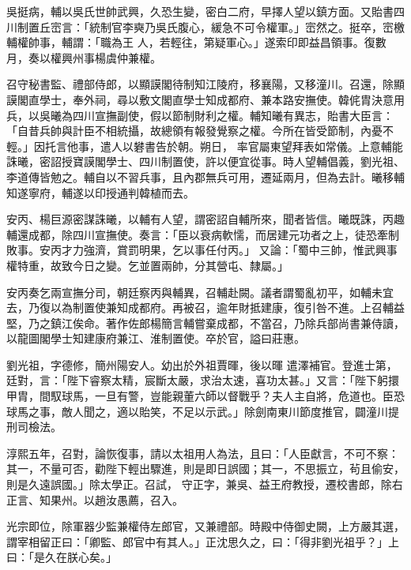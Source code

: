 \begin{pinyinscope}
 吳挺病，輔以吳氏世帥武興，久恐生變，密白二府，早擇人望以鎮方面。又貽書四川制置丘崈言：「統制官李奭乃吳氏腹心，緩急不可令權軍。」崈然之。挺卒，崈檄輔權帥事，輔謂：「職為王
 人，若輕往，第疑軍心。」遂索印即益昌領事。復數月，奏以權興州事楊虞仲兼權。



 召守秘書監、禮部侍郎，以顯謨閣待制知江陵府，移襄陽，又移潼川。召還，除顯謨閣直學士，奉外祠，尋以敷文閣直學士知成都府、兼本路安撫使。韓侂胄決意用兵，以吳曦為四川宣撫副使，假以節制財利之權。輔知曦有異志，貽書大臣言：「自昔兵帥與計臣不相統攝，故總領有報發覺察之權。今所在皆受節制，內憂不輕。」因托言他事，遣人以礬書告於朝。朔日，
 率官屬東望拜表如常儀。上意輔能誅曦，密詔授寶謨閣學士、四川制置使，許以便宜從事。時人望輔倡義，劉光祖、李道傳皆勉之。輔自以不習兵事，且內郡無兵可用，遷延兩月，但為去計。曦移輔知遂寧府，輔遂以印授通判韓植而去。



 安丙、楊巨源密謀誅曦，以輔有人望，謂密詔自輔所來，聞者皆信。曦既誅，丙趣輔還成都，除四川宣撫使。奏言：「臣以衰病軟懦，而居建元功者之上，徒恐牽制敗事。安丙才力強濟，賞罰明果，乞以事任付丙。」
 又論：「蜀中三帥，惟武興事權特重，故致今日之變。乞並置兩帥，分其營屯、隸屬。」



 安丙奏乞兩宣撫分司，朝廷察丙與輔異，召輔赴闕。議者謂蜀亂初平，如輔未宜去，乃復以為制置使兼知成都府。再被召，逾年財抵建康，復引咎不進。上召輔益堅，乃之鎮江俟命。著作佐郎楊簡言輔嘗棄成都，不當召，乃除兵部尚書兼侍讀，以龍圖閣學士知建康府兼江、淮制置使。卒於官，謚曰莊惠。



 劉光祖，字德修，簡州陽安人。幼出於外祖賈暉，後以暉
 遣澤補官。登進士第，廷對，言：「陛下睿察太精，宸斷太嚴，求治太速，喜功太甚。」又言：「陛下躬擐甲胄，間馭球馬，一旦有警，豈能親董六師以督戰乎？夫人主自將，危道也。臣恐球馬之事，敵人聞之，適以貽笑，不足以示武。」除劍南東川節度推官，闢潼川提刑司檢法。



 淳熙五年，召對，論恢復事，請以太祖用人為法，且曰：「人臣獻言，不可不察：其一，不量可否，勸陛下輕出驟進，則是即日誤國；其一，不思振立，茍且偷安，則是久遠誤國。」除太學正。召試，
 守正字，兼吳、益王府教授，遷校書郎，除右正言、知果州。以趙汝愚薦，召入。



 光宗即位，除軍器少監兼權侍左郎官，又兼禮部。時殿中侍御史闕，上方嚴其選，謂宰相留正曰：「卿監、郎官中有其人。」正沈思久之，曰：「得非劉光祖乎？」上曰：「是久在朕心矣。」




\end{pinyinscope}
